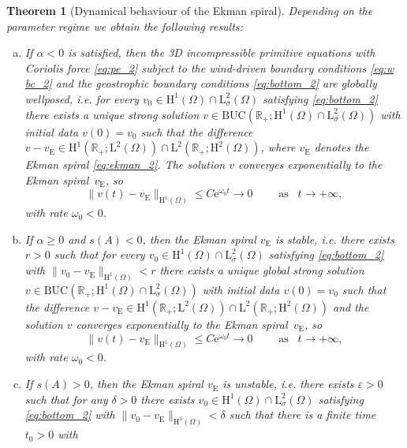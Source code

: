 \documentclass[preprint]{elsarticle}
\newtheorem{thm}{Theorem}[section]
\numberwithin{equation}{section}
\newcommand {\R}	{\mathbb{R}}
\renewcommand{\H}{\mathrm{H}}
\newcommand{\sigmabar}{\bar{\sigma}}
\renewcommand{\bar}[1]{\overline{#1}}
\newcommand{\rL}{\mathrm{L}}
\newcommand{\rH}{\H}
\newcommand{\rE}{\mathrm{E}}
\begin{document}
\begin{thm}[Dynamical behaviour of the Ekman spiral]\label{thm:main_2}
	Depending on the parameter regime we obtain the following results:
	\begin{enumerate}[(a)]
		\item	
		If $\alpha < 0$ is satisfied,
		then the 3D incompressible primitive equations with Coriolis force \eqref{eq:pe_2} subject to the wind-driven boundary conditions \eqref{eq:w bc_2} and the geostrophic boundary conditions \eqref{eq:bottom_2} are globally wellposed, i.e. for every $v_0 \in \rH^{1}(\Omega) \cap \rL^2_{\sigmabar}(\Omega)$ satisfying \eqref{eq:bottom_2} there exists a unique strong solution $v \in 
		\mathrm{BUC}(\R_+;\rH^{1}(\Omega)\cap \rL^2_{\sigmabar}(\Omega))$ with initial data $v(0) = v_0$ such that the difference $v-v_{\rE} \in\rH^{1}(\R_+;\rL^2(\Omega)) \cap \rL^{2}(\R_+;\rH^{2}(\Omega))$, where $v_{\rE}$ denotes the Ekman spiral \eqref{eq:ekman_2}. 
		The solution $v$ converges exponentially to the Ekman spiral~$v_{\rE}$, so
		\begin{equation*}
			\| v(t) - v_{\rE} \|_{\rH^{1}(\Omega)} \leq C \mathrm{e}^{\omega_0 t}\to 0  \qquad \text{ as } \enspace t \to + \infty , 
		\end{equation*}
		with rate $\omega_0 < 0$.	
		\item If $\alpha \geq 0$ and $s(A) < 0$, then the Ekman spiral $v_{\rE}$ is stable, i.e. there exists $r > 0$ such that for every $v_0 \in \rH^{1}(\Omega) \cap \rL^2_{\sigmabar}(\Omega)$ satisfying \eqref{eq:bottom_2}
		with $\| v_0-v_{\rE} \|_{\rH^1(\Omega)} < r$ there exists 
		a unique global strong solution $v \in \mathrm{BUC}(\R_+;\rH^{1}(\Omega)\cap \rL^2_{\sigmabar}(\Omega))$ with initial data $v(0) = v_0$ such that the difference $v-v_{\rE} \in\rH^{1}(\R_+;\rL^2(\Omega)) \cap \rL^{2}(\R_+;\rH^{2}(\Omega))$ 
		and the solution $v$ converges exponentially to the Ekman spiral~$v_{\rE}$, so
		\begin{equation*}
			\| v(t) - v_{\rE} \|_{\rH^{1}(\Omega)} \leq C \mathrm{e}^{\omega_0 t}\to 0  \qquad \text{ as } \enspace t \to + \infty , 
		\end{equation*}
		with rate $\omega_0 < 0$.
		\item If $s(A) > 0$, then the Ekman spiral $v_{\rE}$ is unstable, i.e. there exists $\varepsilon >0$ such that for any $\delta > 0$ there exists $v_0 \in \rH^{1}(\Omega) \cap \rL^2_{\sigmabar}(\Omega)$ satisfying \eqref{eq:bottom_2} with $\| v_0 - v_{\rE} \|_{\rH^1(\Omega)} < \delta$ such that there is a finite time $t_0 > 0$ with

\end{enumerate}
\end{thm}
\end{document}
